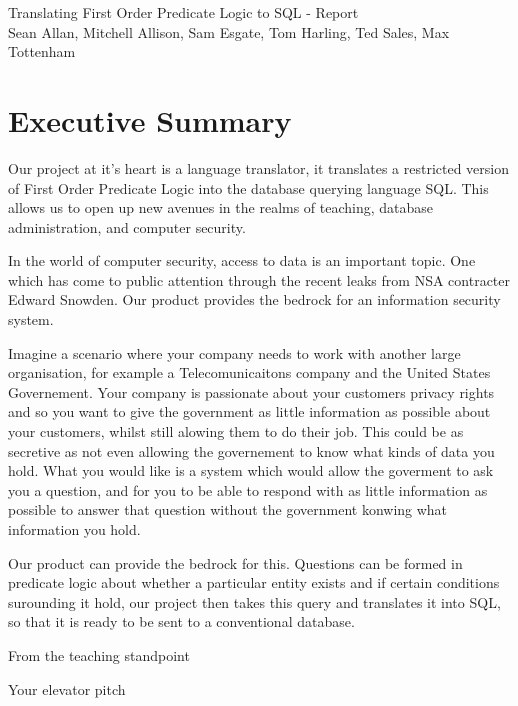 \documentclass[a4wide, 11pt]{article}
\begin{document}
\begin{center} {\huge Translating First Order Predicate Logic to SQL - Report} \\ [0.4cm]
{\large Sean Allan, Mitchell Allison, Sam Esgate, Tom Harling, Ted Sales, Max Tottenham} \\ [0.2cm]
\vspace{0cm} \end{center}


\section{Executive Summary}
Our project at it's heart is a language translator, it translates a restricted
version of First Order Predicate Logic into the database querying language
SQL. This allows us to open up new avenues in the realms of teaching, database
administration, and computer security.

In the world of computer security, access to data is an important topic. 
One which has come to public attention through the recent leaks from NSA
contracter Edward Snowden. Our product provides the bedrock for an information 
security system. 

Imagine a scenario where your company needs to work with another large organisation, 
for example a Telecomunicaitons company and the United States Governement. Your company
is passionate about your customers privacy rights and so you want to give the 
government as little information as possible about your customers, whilst still alowing
them to do their job. This could be as secretive as not even allowing the governement 
to know what kinds of data you hold. What you would like is a system which would allow
the goverment to ask you a question, and for you to be able to respond with as little 
information as possible to answer that question without the government konwing what 
information you hold. 

Our product can provide the bedrock for this. Questions can be formed in predicate 
logic about whether a particular entity exists and if certain conditions surounding 
it hold, our project then takes this query and translates it into SQL, so that it is
ready to be sent to a conventional database.

From the teaching standpoint 


        Your elevator pitch
\end{document}
